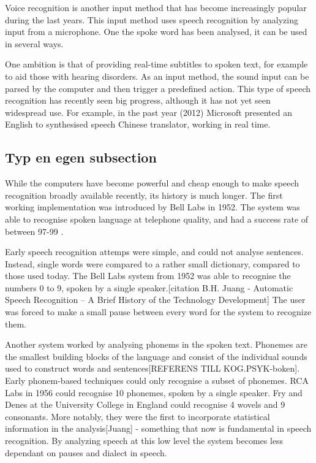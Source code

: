 Voice recognition is another input method that has become increasingly popular during the last years. This input method uses speech recognition by analyzing input from a microphone. One the spoke word has been analysed, it can be used in several ways.

One ambition is that of providing real-time subtitles to spoken text, for example to aid those with hearing disorders. As an input method, the sound input can be parsed by the computer and then trigger a predefined action. This type of speech recognition has recently seen big progress, although it has not yet seen widespread use. For example, in the past year (2012) Microsoft presented an English to synthesised speech Chinese translator, working in real time.

\subsection{Typ en egen subsection}

While the computers have become powerful and cheap enough to make speech recognition broadly available recently, its history is much longer. The first working implementation was introduced by Bell Labs in 1952. The system was able to recognise spoken language at telephone quality, and had a success rate of between 97-99 \cite{Davis52}.

Early speech recognition attemps were simple, and could not analyse sentences. Instead, single words were compared to a rather small dictionary, compared to those used today. The Bell Labs system from 1952 was able to recognise the numbers 0 to 9, spoken by a single speaker.[citation B.H. Juang - Automatic Speech Recognition – A Brief History of the Technology Development] The user was forced to make a small pause between every word for the system to recognize them. 

Another system worked by analysing phonems in the spoken text. Phonemes are the smallest building blocks of the language and consist of the individual sounds used to construct words and sentences[REFERENS TILL KOG.PSYK-boken]. Early phonem-based techniques could only recognise a subset of phonemes. RCA Labs in 1956 could recognise 10 phonemes, spoken by a single speaker. Fry and Denes at the University College in England could recognise 4 wovels and 9 consonants. More notably, they were the first to incorporate statistical information in the analysis[Juang] - something that now is fundamental in speech recognition. By analyzing speech at this low level the system becomes less dependant on pauses and dialect in speech.


